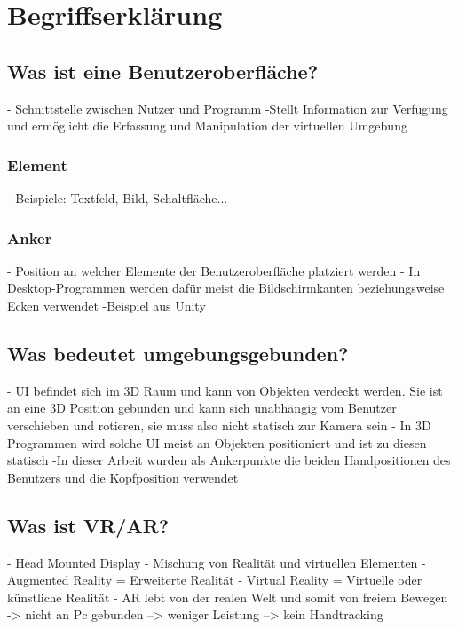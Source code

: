 \documentclass[a4paper]{scrartcl}
\begin{document}
	\maketitle %
	
	\tableofcontents %
	\newpage %
	\setcounter{page}{1}
	\newpage %
	\section{Begriffserklärung}
	
	\subsection{Was ist eine Benutzeroberfläche?}
	- Schnittstelle zwischen Nutzer und Programm
	-Stellt Information zur Verfügung und ermöglicht die Erfassung und Manipulation der virtuellen Umgebung
	
	\subsubsection{Element}
	- Beispiele: Textfeld, Bild, Schaltfläche...
	
	\subsubsection{Anker}
	- Position an welcher Elemente der Benutzeroberfläche platziert werden
	- In Desktop-Programmen werden dafür meist die Bildschirmkanten beziehungsweise Ecken verwendet
	-Beispiel aus Unity
	
	\subsection{Was bedeutet umgebungsgebunden?}
	- UI befindet sich im 3D Raum und kann von Objekten verdeckt werden. Sie ist an eine 3D Position gebunden und kann sich unabhängig vom Benutzer verschieben und rotieren, sie muss also nicht statisch zur Kamera sein
	- In 3D Programmen wird solche UI meist an Objekten positioniert und ist zu diesen statisch
	-In dieser Arbeit wurden als Ankerpunkte die beiden Handpositionen des Benutzers und die Kopfposition verwendet
	
	\subsection{Was ist VR/AR?}
	- Head Mounted Display
	- Mischung von Realität und virtuellen Elementen
	- Augmented Reality = Erweiterte Realität
	- Virtual Reality = Virtuelle oder künstliche Realität
	- AR lebt von der realen Welt und somit von freiem Bewegen
	-> nicht an Pc gebunden
	--> weniger Leistung
	--> kein Handtracking
	
\end{document}
